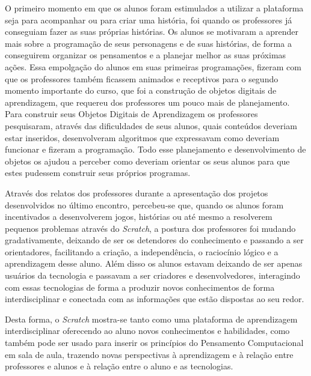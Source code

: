\documentclass[12pt, openright, a4paper, brazil, english, french, spanish, bibjustif, openany, oneside]{abntex2}
\begin{document}
O primeiro momento em que os alunos foram estimulados a utilizar a plataforma seja para acompanhar ou para criar uma história, foi quando os professores já conseguiam fazer as suas próprias histórias. Os alunos se motivaram a aprender mais sobre a programação de seus personagens e de suas histórias, de forma a conseguirem organizar os pensamentos e a planejar melhor as suas próximas ações. Essa empolgação do alunos em suas primeiras programações, fizeram com que os professores também ficassem animados e receptivos para o segundo momento importante do curso, que foi a construção de objetos digitais de aprendizagem, que requereu dos professores um pouco mais de planejamento. Para construir seus Objetos Digitais de Aprendizagem os professores pesquisaram, através das dificuldades de seus alunos, quais conteúdos deveriam estar inseridos, desenvolveram algoritmos que expressavam como deveriam funcionar e fizeram a programação. Todo esse planejamento e desenvolvimento de objetos os ajudou a perceber como deveriam orientar os seus alunos para que estes pudessem construir seus próprios programas.

Através dos relatos dos professores durante a apresentação dos projetos desenvolvidos no último encontro, percebeu-se que, quando os alunos foram incentivados a desenvolverem jogos, histórias ou até mesmo a resolverem pequenos problemas através do \textit{Scratch}, a postura dos professores foi mudando gradativamente, deixando de ser os detendores do conhecimento e passando a ser orientadores, facilitando a criação, a independência, o raciocínio lógico e a aprendizagem desse aluno. Além disso os alunos estavam deixando de ser apenas usuários da tecnologia e passavam a ser criadores e desenvolvedores, interagindo com essas tecnologias de forma a produzir novos conhecimentos de forma interdisciplinar e conectada com as informações que estão dispostas ao seu redor.

Desta forma, o \textit{Scratch} mostra-se tanto como uma plataforma de aprendizagem interdisciplinar oferecendo ao aluno novos conhecimentos e habilidades, como também pode ser usado para inserir os princípios do Pensamento Computacional em sala de aula, trazendo novas perspectivas à aprendizagem e à relação entre professores e alunos e à relação entre o aluno e as tecnologias.



% 


\end{document}
